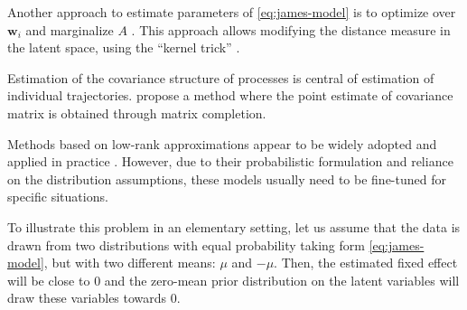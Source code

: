 \documentclass[preprint]{imsart}
\numberwithin{equation}{section}
\theoremstyle{plain}
\newcommand{\bw}{\mathbf{w}}
\begin{document}
Another approach to estimate parameters of \eqref{eq:james-model} is to optimize over $\bw_i$ and marginalize $A$ \citep{lawrence2004gaussian}. This approach allows modifying the distance measure in the latent space, using the ``kernel trick'' \citep{schulam2016disease}.

Estimation of the covariance structure of processes is central of estimation of individual trajectories. \citet{descary2016functional} propose a method where the point estimate of covariance matrix is obtained through matrix completion. 

Methods based on low-rank approximations appear to be widely adopted and applied in practice \citep{berkey1983longitudinal, yan2017dynamic, hall2006properties, besse1986principal, yao2006penalized, greven2011longitudinal}. However, due to their probabilistic formulation and reliance on the distribution assumptions, these models usually need to be fine-tuned for specific situations.

To illustrate this problem in an elementary setting, let us assume that the data is drawn from two distributions with equal probability taking form \eqref{eq:james-model}, but with two different means: $\mu$ and $-\mu$. Then, the estimated fixed effect will be close to $0$ and the zero-mean prior distribution on the latent variables will draw these variables towards $0$.
\end{document}
